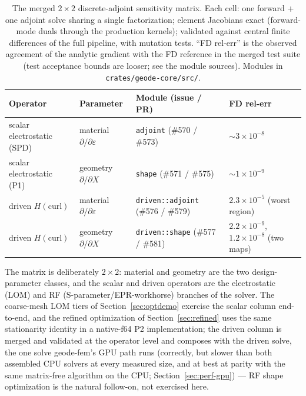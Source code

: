 \documentclass{anvil-paper}
\begin{document}
\begin{table}[t]
  \centering
  \caption{The merged $2\times 2$ discrete-adjoint sensitivity matrix.
  Each cell: one forward + one adjoint solve sharing a single
  factorization; element Jacobians exact (forward-mode duals through the
  production kernels); validated against central finite differences of
  the full pipeline, with mutation tests. ``FD rel-err'' is the observed
  agreement of the analytic gradient with the FD reference in the merged
  test suite (test acceptance bounds are looser; see the module sources).
  Modules in \texttt{crates/geode-core/src/}.}
  \label{tab:adjoint-matrix}
  \footnotesize
  \setlength{\tabcolsep}{4pt}
  \begin{tabular}{@{}llll@{}}
    \toprule
    Operator & Parameter & Module (issue / PR) & FD rel-err \\
    \midrule
    scalar electrostatic (SPD) & material $\partial/\partial\varepsilon$ &
      \texttt{adjoint} (\#570 / \#573) & ${\sim}3\times10^{-8}$ \\
    scalar electrostatic (P1) & geometry $\partial/\partial X$ &
      \texttt{shape} (\#571 / \#575) & ${\sim}1\times10^{-9}$ \\
    driven $H(\mathrm{curl})$ & material $\partial/\partial\varepsilon$ &
      \texttt{driven::adjoint} (\#576 / \#579) & $2.3\times10^{-5}$ (worst region) \\
    driven $H(\mathrm{curl})$ & geometry $\partial/\partial X$ &
      \texttt{driven::shape} (\#577 / \#581) & $2.2\times10^{-9}$, $1.2\times10^{-8}$ (two maps) \\
    \bottomrule
  \end{tabular}
\end{table}

The matrix is deliberately $2\times 2$: material and geometry are the two
design-parameter classes, and the scalar and driven operators are the
electrostatic (LOM) and RF (S-parameter/EPR-workhorse) branches of the
solver. The coarse-mesh LOM tiers of Section~\ref{sec:optdemo} exercise
the scalar column end-to-end, and the refined optimization of
Section~\ref{sec:refined} uses the same stationarity identity in a
native-f64 P2 implementation; the driven column is merged and validated at
the operator level and composes with the driven solve, the one solve
geode-fem's GPU path runs (correctly, but slower than both assembled CPU
solvers at every measured size, and at best at parity with the same
matrix-free algorithm on the CPU; Section~\ref{sec:perf-gpu}) --- RF shape optimization is
the natural follow-on, not exercised here.
\end{document}
